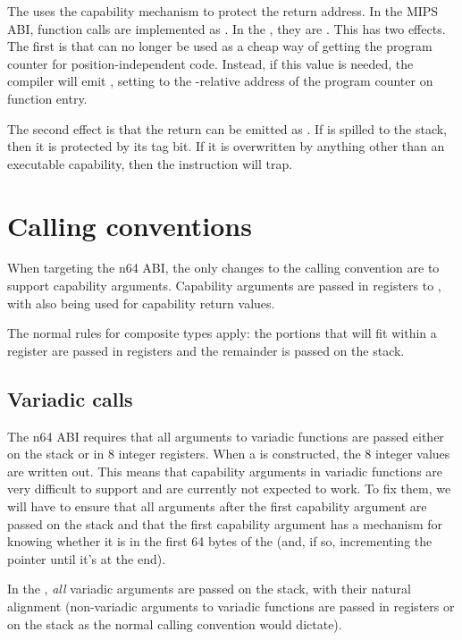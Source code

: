 The \sandboxABI{} uses the capability mechanism to protect the return address.
In the MIPS ABI, function calls are implemented as .
In the \sandboxABI{}, they are .
This has two effects.
The first is that  can no longer be used as a cheap way of getting the program counter for position-independent code.
Instead, if this value is needed, the compiler will emit , setting  to the -relative address of the program counter on function entry.

The second effect is that the return can be emitted as .%
If  is spilled to the stack, then it is protected by its tag bit.
If it is overwritten by anything other than an executable capability, then the  instruction will trap.

\section{Calling conventions}

When targeting the n64 ABI, the only changes to the calling convention are to support capability arguments.
Capability arguments are passed in registers  to , with  also being used for capability return values.

The normal rules for composite types apply: the portions that will fit within a register are passed in registers and the remainder is passed on the stack.

\subsection{Variadic calls}

The n64 ABI requires that all arguments to variadic functions are passed either on the stack or in 8 integer registers.
When a  is constructed, the 8 integer values are written out.
This means that capability arguments in variadic functions are very difficult to support and are currently not expected to work.
To fix them, we will have to ensure that all arguments after the first capability argument are passed on the stack and that the first capability argument has a mechanism for knowing whether it is in the first 64 bytes of the  (and, if so, incrementing the pointer until it's at the end).

In the \sandboxABI{}, \textit{all} variadic arguments are passed on the stack, with their natural alignment (non-variadic arguments to variadic functions are passed in registers or on the stack as the normal calling convention would dictate).

